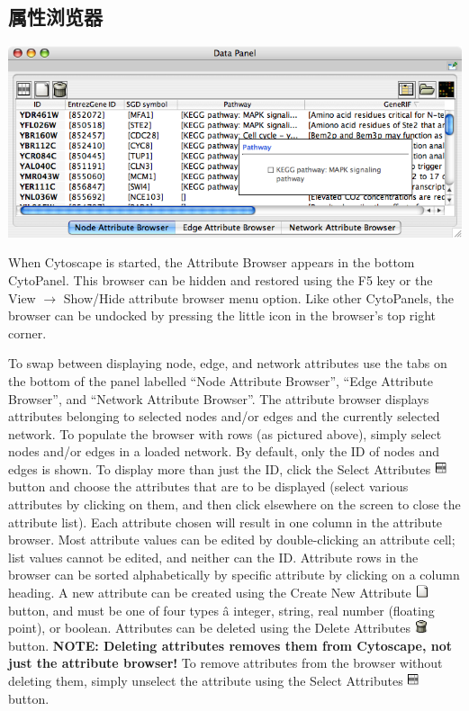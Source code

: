 \subsection{属性浏览器}

\includegraphics[width=.5\textwidth]{images/attribute_browser26.png} 
 
When Cytoscape is started, the Attribute Browser appears in the bottom
CytoPanel. This browser can be hidden and restored using the F5 key or the View
$\rightarrow$ Show/Hide attribute browser menu option. Like other CytoPanels, the
browser can be undocked by pressing the little icon in the browser's
top right corner. 


 To swap between displaying node, edge, and network attributes use the tabs on
the bottom of the panel labelled ``Node Attribute Browser'', ``Edge Attribute
Browser'', and ``Network Attribute Browser''. The attribute browser displays
attributes belonging to selected nodes and/or edges and the currently selected
network. To populate the browser with rows (as pictured above), simply select
nodes and/or edges in a loaded network. By default, only the ID of nodes and
edges is shown. To display more than just the ID, click the Select Attributes
\includegraphics[width=1em]{images/attributes_select_icon.png}  button and choose
the attributes that are to be displayed (select various attributes by clicking
on them, and then click elsewhere on the screen to close the attribute list).
Each attribute chosen will result in one column in the attribute browser. Most
attribute values can be edited by double-clicking an attribute cell; list
values cannot be edited, and neither can the ID. Attribute rows in the browser
can be sorted alphabetically by specific attribute by clicking on a column
heading. A new attribute can be created using the Create New Attribute
\includegraphics[width=1em]{images/attributes_new_icon.png}  button, and must be
one of four types \^a integer, string, real number (floating point), or
boolean. Attributes can be deleted using the Delete Attributes
\includegraphics[width=1em]{images/attributes_delete_icon.png}  button.
\textbf{NOTE: Deleting attributes removes them from Cytoscape, not just the
attribute browser!} To remove attributes from the browser without deleting
them, simply unselect the attribute using the Select Attributes
\includegraphics[width=1em]{images/attributes_select_icon.png}  button. 


